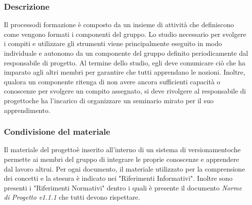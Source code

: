 		\subsubsection{Descrizione}
			Il processo\glosp di formazione è composto da un insieme di attività che definiscono come vengono formati i componenti del gruppo.
			Lo studio necessario per svolgere i compiti e utilizzare gli strumenti viene principalmente eseguito in modo individuale e autonomo da un componente del gruppo definito periodicamente dal responsabile di progetto\glo. Al termine dello studio, egli deve comunicare ciò che ha imparato agli altri membri per garantire che tutti apprendano le nozioni.
			Inoltre, qualora un componente ritenga di non avere ancora sufficienti capacità o conoscenze per svolgere un compito assegnato, si deve rivolgere al responsabile di progetto\glosp che ha l'incarico di organizzare un seminario mirato per il suo apprendimento.
			
		\subsubsection{Condivisione del materiale}
			Il materiale del progetto\glosp è inserito all'interno di un sistema di versionamento\glosp che permette ai membri del gruppo di integrare le proprie conoscenze e apprendere dal lavoro altrui.
			Per ogni documento, il materiale utilizzato per la comprensione dei concetti e la stesura è indicato nei "Riferimenti Informativi".
			Inoltre sono presenti i "Riferimenti Normativi" dentro i quali è presente il documento \textit{Norme di Progetto v1.1.1} che tutti devono rispettare.
